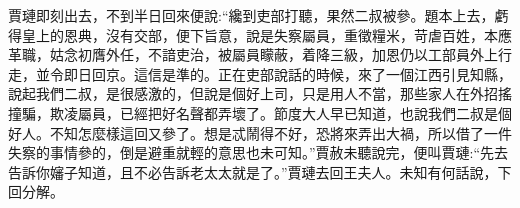 \begin{parag}
    賈璉即刻出去，不到半日回來便說:“纔到吏部打聽，果然二叔被參。題本上去，虧得皇上的恩典，沒有交部，便下旨意，說是失察屬員，重徵糧米，苛虐百姓，本應革職，姑念初膺外任，不諳吏治，被屬員矇蔽，着降三級，加恩仍以工部員外上行走，並令即日回京。這信是準的。正在吏部說話的時候，來了一個江西引見知縣，說起我們二叔，是很感激的，但說是個好上司，只是用人不當，那些家人在外招搖撞騙，欺凌屬員，已經把好名聲都弄壞了。節度大人早已知道，也說我們二叔是個好人。不知怎麼樣這回又參了。想是忒鬧得不好，恐將來弄出大禍，所以借了一件失察的事情參的，倒是避重就輕的意思也未可知。”賈赦未聽說完，便叫賈璉:“先去告訴你嬸子知道，且不必告訴老太太就是了。”賈璉去回王夫人。未知有何話說，下回分解。
\end{parag}